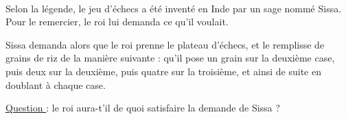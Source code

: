 \documentclass[
	classe=$2^{de}$,
	exercices=Activité\space Chapitre\space 2
]{exercice}
\begin{document}
\vspace{1em}
\begin{exercice}\

	Selon la légende, le jeu d'échecs a été inventé en Inde par un sage nommé Sissa. Pour le remercier, le roi lui demanda ce qu'il voulait.

	Sissa demanda alors que le roi prenne le plateau d'échecs, et le remplisse de grains de riz de la manière suivante : qu'il pose un grain sur la deuxième case, puis deux sur la deuxième, puis quatre sur la troisième, et ainsi de suite en doublant à chaque case.

	\uline{Question } : le roi aura-t'il de quoi satisfaire la demande de Sissa ?
\end{exercice}
\end{document}
